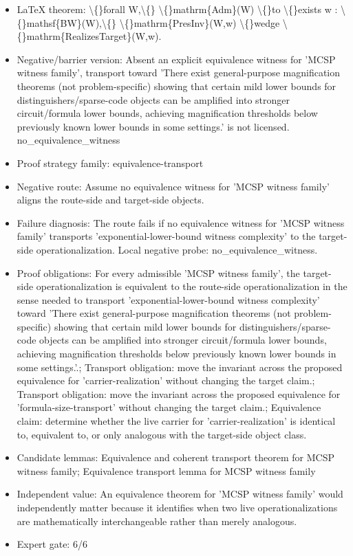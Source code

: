 \documentclass[11pt]{article}
\begin{document}
\begin{itemize}
\item LaTeX theorem: \textbackslash\{\}forall W,\textbackslash\{\} \textbackslash\{\}mathrm\{Adm\}(W) \textbackslash\{\}to \textbackslash\{\}exists w : \textbackslash\{\}mathsf\{BW\}(W),\textbackslash\{\} \textbackslash\{\}mathrm\{PresInv\}(W,w) \textbackslash\{\}wedge \textbackslash\{\}mathrm\{RealizesTarget\}(W,w).
\item Negative/barrier version: Absent an explicit equivalence witness for 'MCSP witness family', transport toward 'There exist general-purpose magnification theorems (not problem-specific) showing that certain mild lower bounds for distinguishers/sparse-code objects can be amplified into stronger circuit/formula lower bounds, achieving magnification thresholds below previously known lower bounds in some settings.' is not licensed. no\_equivalence\_witness
\item Proof strategy family: equivalence-transport
\item Negative route: Assume no equivalence witness for 'MCSP witness family' aligns the route-side and target-side objects.
\item Failure diagnosis: The route fails if no equivalence witness for 'MCSP witness family' transports 'exponential-lower-bound witness complexity' to the target-side operationalization. Local negative probe: no\_equivalence\_witness.
\item Proof obligations: For every admissible 'MCSP witness family', the target-side operationalization is equivalent to the route-side operationalization in the sense needed to transport 'exponential-lower-bound witness complexity' toward 'There exist general-purpose magnification theorems (not problem-specific) showing that certain mild lower bounds for distinguishers/sparse-code objects can be amplified into stronger circuit/formula lower bounds, achieving magnification thresholds below previously known lower bounds in some settings.'.; Transport obligation: move the invariant across the proposed equivalence for 'carrier-realization' without changing the target claim.; Transport obligation: move the invariant across the proposed equivalence for 'formula-size-transport' without changing the target claim.; Equivalence claim: determine whether the live carrier for 'carrier-realization' is identical to, equivalent to, or only analogous with the target-side object class.
\item Candidate lemmas: Equivalence and coherent transport theorem for MCSP witness family; Equivalence transport lemma for MCSP witness family
\item Independent value: An equivalence theorem for 'MCSP witness family' would independently matter because it identifies when two live operationalizations are mathematically interchangeable rather than merely analogous.
\item Expert gate: 6/6
\end{itemize}
\end{document}

